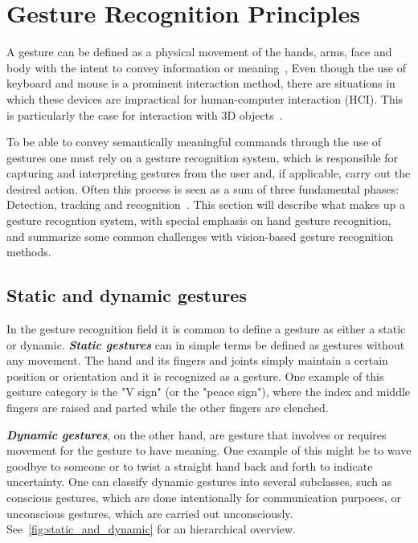 
\section{Gesture Recognition Principles}
A gesture can be defined as a physical movement of the hands, arms, face and body with the intent to convey information or meaning~\citep{Mitra2007}, 
Even though the use of keyboard and mouse is a prominent interaction method, there are situations in which
these devices are impractical for human-computer interaction (HCI). This is particularly the case for interaction with 3D objects~\citep{Rautaray2015}. 

To be able to convey semantically meaningful commands through the use of gestures one must rely on a gesture recognition system, 
which is responsible for capturing and interpreting gestures from the user and, if applicable, carry out the desired action. 
Often this process is seen as a sum of three fundamental phases: Detection, tracking and recognition~\citep{Rautaray2015}.
This section will describe what makes up a gesture recogntion system, with special emphasis on hand gesture recognition, and
summarize some common challenges with vision-based gesture recognition methods.

\subsection{Static and dynamic gestures}
In the gesture recognition field it is common to define a gesture as either a static or dynamic. \textbf{\textit{Static gestures}} can in simple terms be defined as gestures
without any movement. The hand and its fingers and joints simply maintain a certain position or orientation and it is recognized as a gesture. One example 
of this gesture category is the "V sign" (or the "peace sign"), where the index and middle fingers are raised and parted while the other fingers are clenched.

\textbf{\textit{Dynamic gestures}}, on the other hand, are gesture that involves or requires movement for the gesture to have meaning. One example of this
might be to wave goodbye to someone or to twist a straight hand back and forth to indicate uncertainty. One can classify dynamic gestures into several 
subclasses, such as conscious gestures, which are done intentionally for communication purposes, or unconscious gestures, which are carried out unconsciously.
See~\vref{fig:static_and_dynamic} for an hierarchical overview.

